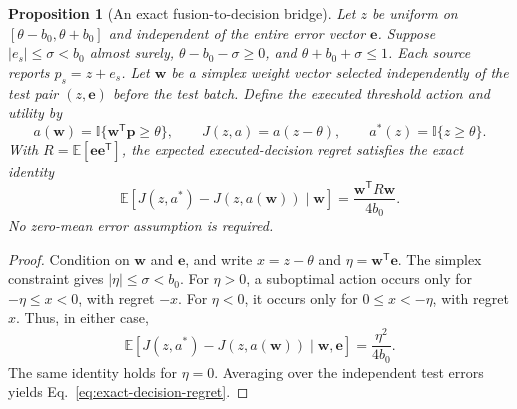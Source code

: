 \documentclass[10pt]{article}
\newtheorem{proposition}{Proposition}
\begin{document}
\begin{proposition}[An exact fusion-to-decision bridge]
\label{prop:threshold-decision-bridge}
Let $z$ be uniform on $[\theta-b_0,\theta+b_0]$ and independent of the
entire error vector $\boldsymbol e$. Suppose
$|e_s|\le\sigma<b_0$ almost surely,
$\theta-b_0-\sigma\ge0$, and $\theta+b_0+\sigma\le1$.
Each source reports $p_s=z+e_s$.
Let $\boldsymbol w$ be a simplex weight vector selected independently of
the test pair $(z,\boldsymbol e)$ before the test batch. Define the executed
threshold action and utility by
\begin{equation}
 a(\boldsymbol w)=\mathbb I\{\boldsymbol w^{\mathsf T}\boldsymbol p\ge\theta\},
 \qquad J(z,a)=a(z-\theta),
 \qquad a^*(z)=\mathbb I\{z\ge\theta\}.
\end{equation}
With $R=\mathbb E[\boldsymbol e\boldsymbol e^{\mathsf T}]$, the expected
executed-decision regret satisfies the exact identity
\begin{equation}
 \mathbb E[J(z,a^*)-J(z,a(\boldsymbol w))\mid\boldsymbol w]
 =\frac{\boldsymbol w^{\mathsf T}R\boldsymbol w}{4b_0}.
 \label{eq:exact-decision-regret}
\end{equation}
No zero-mean error assumption is required.
\end{proposition}

\begin{proof}
Condition on $\boldsymbol w$ and $\boldsymbol e$, and write
$x=z-\theta$ and $\eta=\boldsymbol w^{\mathsf T}\boldsymbol e$.
The simplex constraint gives $|\eta|\le\sigma<b_0$.
For $\eta>0$, a suboptimal action occurs only for $-\eta\le x<0$, with
regret $-x$. For $\eta<0$, it occurs only for $0\le x<-\eta$, with regret
$x$. Thus, in either case,
\begin{equation}
 \mathbb E[J(z,a^*)-J(z,a(\boldsymbol w))\mid\boldsymbol w,\boldsymbol e]
 =\frac{\eta^2}{4b_0}.
\end{equation}
The same identity holds for $\eta=0$. Averaging over the independent test
errors yields Eq.~\eqref{eq:exact-decision-regret}.
\end{proof}
\end{document}

